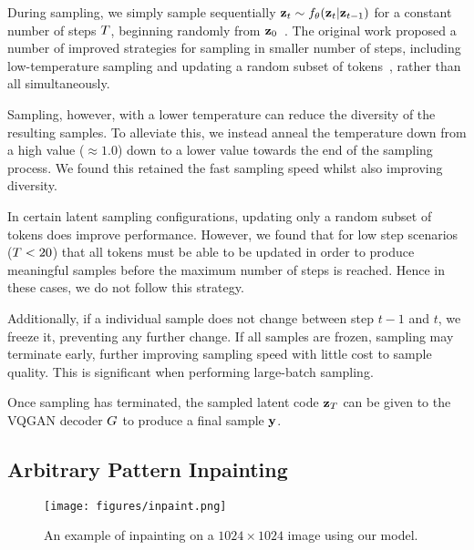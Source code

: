 During sampling, we simply sample sequentially $\mathbf{z}_t \sim f_\theta(\mathbf{z}_t
\vert \mathbf{z}_{t-1})$ for a constant number of steps $T$, beginning
randomly from $\mathbf{z}_0$~\cite{savinov2022stepunrolled}. The original work
proposed a number of improved strategies for sampling in smaller number of
steps, including low-temperature sampling and updating a random subset of
tokens~\cite{savinov2022stepunrolled}, rather than all simultaneously.

Sampling, however, with a lower temperature can reduce the diversity of the
resulting samples. To alleviate this, we instead anneal the temperature down
from a high value ($\approx 1.0$) down to a lower value towards the end of the
sampling process. We found this retained the fast sampling speed whilst also
improving diversity.

In certain latent sampling configurations, updating only a random subset of
tokens does improve performance. However, we found that for low step scenarios
($T<20$) that all tokens must be able to be updated in order to
produce meaningful samples before the maximum number of steps is reached. Hence
in these cases, we do not follow this strategy.

Additionally, if a individual sample does not change between step $t-1$ and $t$,
we freeze it, preventing any further change. If all samples are frozen, sampling
may terminate early, further improving sampling speed with little cost to
sample quality. This is significant when performing large-batch sampling.

Once sampling has terminated, the sampled latent code $\mathbf{z}_T$ can be given
to the VQGAN decoder $G$ to produce a final sample $\mathbf{y}$.

\subsection{Arbitrary Pattern Inpainting}

\begin{figure}[t]
    \label{fig:inpaintExample}
    \centering
    \texttt{[image: figures/inpaint.png]}
    \caption{An example of inpainting on a $1024 \times 1024$ image using our
    model.}
\end{figure}

